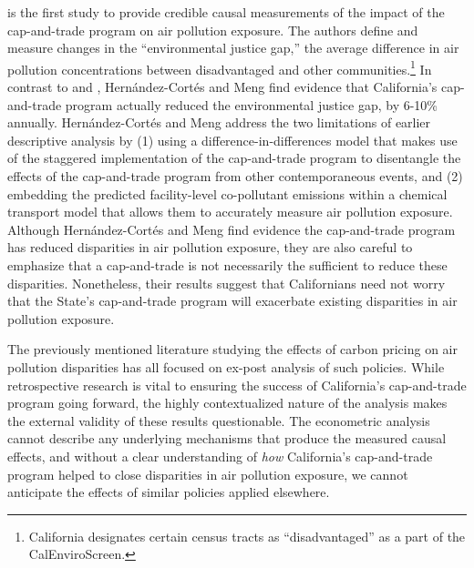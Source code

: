 \cite{hernandez2023environmental} is the first study to provide credible causal measurements of the impact of the cap-and-trade program on air pollution exposure. The authors define and measure changes in the ``environmental justice gap,'' the average difference in air pollution concentrations between disadvantaged and other communities.\footnote{California designates certain census tracts as ``disadvantaged” as a part of the CalEnviroScreen.} In contrast to \cite{cushing2018carbon} and \cite{pastor2022up}, Hernández-Cortés and Meng find evidence that California's cap-and-trade program actually reduced the environmental justice gap, by 6-10\% annually. Hernández-Cortés and Meng address the two limitations of earlier descriptive analysis by (1) using a difference-in-differences model that makes use of the staggered implementation of the cap-and-trade program to disentangle the effects of the cap-and-trade program from other contemporaneous events, and (2) embedding the predicted facility-level co-pollutant emissions within a chemical transport model that allows them to accurately measure air pollution exposure. Although Hernández-Cortés and Meng find evidence the cap-and-trade program has reduced disparities in air pollution exposure, they are also careful to emphasize that a cap-and-trade is not necessarily the sufficient to reduce these disparities. Nonetheless, their results suggest that Californians need not worry that the State's cap-and-trade program will exacerbate existing disparities in air pollution exposure. 


The previously mentioned literature studying the effects of carbon pricing on air pollution disparities has all focused on ex-post analysis of such policies. While retrospective research is vital to ensuring the success of California's cap-and-trade program going forward, the highly contextualized nature of the analysis makes the external validity of these results questionable. The econometric analysis cannot describe any underlying mechanisms that produce the measured causal effects, and without a clear understanding of \emph{how} California's cap-and-trade program helped to close disparities in air pollution exposure, we cannot anticipate the effects of similar policies applied elsewhere. 

